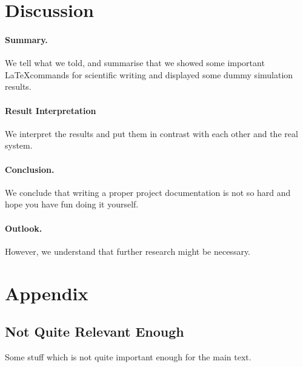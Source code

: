 \documentclass[a4paper,11pt]{scrartcl}
\begin{document}
\section{Discussion}
\paragraph{Summary.} We tell what we told, and summarise that we showed some important \LaTeX commands for scientific writing and displayed some dummy simulation results.
\paragraph{Result Interpretation}
We interpret the results and put them in contrast with each other and the real system. 
\paragraph{Conclusion.} We conclude that writing a proper project documentation is not so hard and hope you have fun doing it yourself. 
\paragraph{Outlook.} However, we understand that further research might be necessary.
\newpage




\appendix
\section{Appendix}
\subsection{Not Quite Relevant Enough}
Some stuff which is not quite important enough for the main text.
\end{document}
